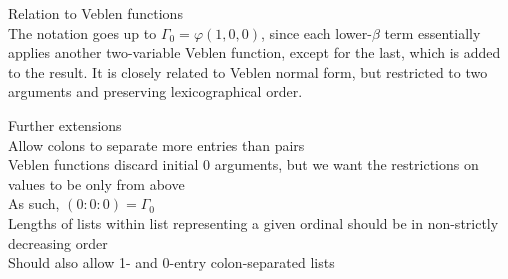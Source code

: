 \documentclass{article}
\begin{document}
Relation to Veblen functions \\
The notation goes up to $\Gamma_0=\varphi(1, 0, 0)$,
since each lower-$\beta$ term essentially applies
another two-variable Veblen function,
except for the last, which is added to the result.
It is closely related to Veblen normal form,
but restricted to two arguments
and preserving lexicographical order.

Further extensions \\
Allow colons to separate more entries than pairs \\
Veblen functions discard initial 0 arguments,
but we want the restrictions on values to be only from above \\
As such, $(0:0:0) = \Gamma_0$ \\
Lengths of lists within list representing a given ordinal
should be in non-strictly decreasing order \\
Should also allow 1- and 0-entry colon-separated lists \\



\end{document}
